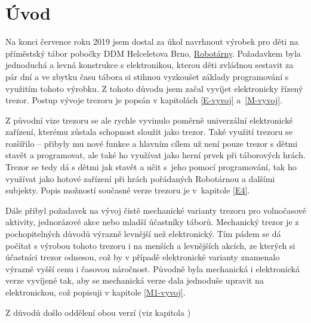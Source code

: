 \chapter{Úvod}

Na konci července roku 2019 jsem dostal za úkol navrhnout výrobek pro děti na příměstský tábor pobočky DDM Helceletova Brno, \href{https://helceletka.cz/robotarna/}{Robotárny}.
Poža\-dav\-kem byla jednoduchá a levná konstrukce s elektronikou, kterou děti zvládnou sestavit za pár dní a ve zbytku času tábora si stihnou vyzkoušet základy programování 
s využitím tohoto výrobku. Z tohoto důvodu jsem začal vyvíjet elektronicky řízený trezor. Postup vývoje trezoru je popsán v kapitolách \ref{E-vyvoj} a~\ref{M-vyvoj}.

Z původní vize trezoru se ale rychle vyvinulo poměrně univerzální elektronické zařízení, kterému zůstala schopnost sloužit jako trezor.
Také využití trezoru se rozšířilo -- přibyly mu nové funkce a hlavním cílem už není pouze trezor  s dětmi stavět a programovat, 
ale také ho využívat jako herní prvek při táborových hrách. 
Trezor se tedy dá s dětmi jak stavět a učit s~jeho pomocí programování, tak ho využívat jako hotové zařízení při hrách pořádaných Robotárnou a dalšími subjekty.
Popis možností současné verze trezoru je v~kapitole \ref{E4}.

Dále přibyl požadavek na vývoj čistě mechanické varianty trezoru pro volnočasové aktivity, jednorázové akce nebo mladší účastníky táborů.
Mechanický trezor je z pochopitelných důvodů výrazně levnější než elektronický. Tím pádem se dá počítat s výrobou tohoto trezoru i na menších a levnějších akcích, ze kterých 
si účastníci trezor odnesou, což by v případě elektronické varianty znamenalo výrazně vyšší cenu i časovou náročnost.
Původně byla mechanická i elektronická verze vyvíjené tak, aby se mechanická verze dala jednoduše upravit na elektronickou, což popisuji v kapitole \ref{M1-vyvoj}.

Z důvodů %
došlo oddělení obou verzí (viz kapitola %
)


